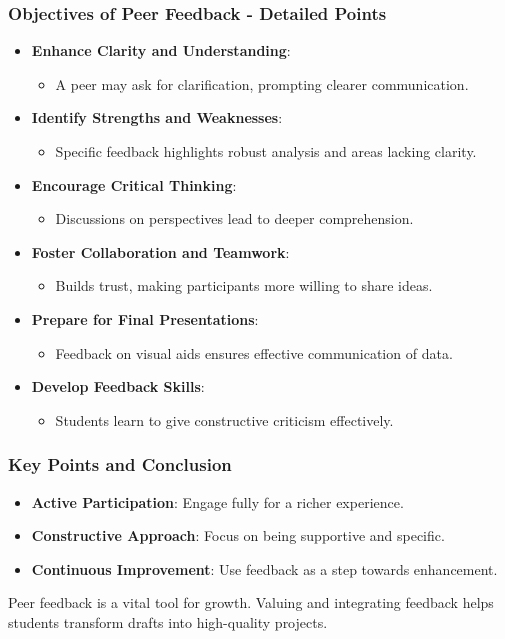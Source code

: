 \documentclass[aspectratio=169]{beamer}
\begin{document}
\begin{frame}[fragile]
    \frametitle{Objectives of Peer Feedback - Detailed Points}
    \begin{itemize}
        \item \textbf{Enhance Clarity and Understanding}:
            \begin{itemize}
                \item A peer may ask for clarification, prompting clearer communication.
            \end{itemize}
        \item \textbf{Identify Strengths and Weaknesses}:
            \begin{itemize}
                \item Specific feedback highlights robust analysis and areas lacking clarity.
            \end{itemize}
        \item \textbf{Encourage Critical Thinking}:
            \begin{itemize}
                \item Discussions on perspectives lead to deeper comprehension.
            \end{itemize}
        \item \textbf{Foster Collaboration and Teamwork}:
            \begin{itemize}
                \item Builds trust, making participants more willing to share ideas.
            \end{itemize}
        \item \textbf{Prepare for Final Presentations}:
            \begin{itemize}
                \item Feedback on visual aids ensures effective communication of data.
            \end{itemize}
        \item \textbf{Develop Feedback Skills}:
            \begin{itemize}
                \item Students learn to give constructive criticism effectively.
            \end{itemize}
    \end{itemize}
\end{frame}

\begin{frame}[fragile]
    \frametitle{Key Points and Conclusion}
    \begin{itemize}
        \item \textbf{Active Participation}: Engage fully for a richer experience.
        \item \textbf{Constructive Approach}: Focus on being supportive and specific.
        \item \textbf{Continuous Improvement}: Use feedback as a step towards enhancement.
    \end{itemize}
    
    Peer feedback is a vital tool for growth. Valuing and integrating feedback helps students transform drafts into high-quality projects.
\end{frame}
\end{document}
